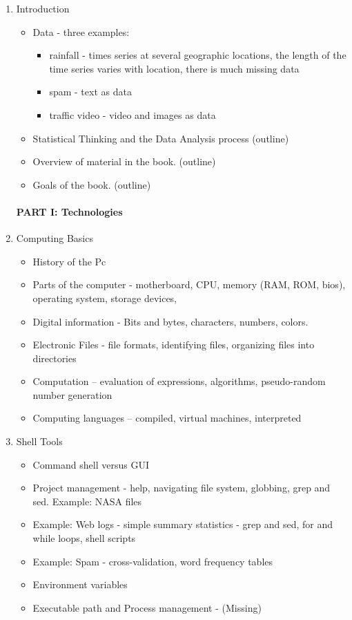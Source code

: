 \documentclass[11pt,timesroman]{article}
\begin{document}
\begin{enumerate}

\item{Introduction}
\begin{itemize}
        \item Data - three examples: 
          \begin{itemize}
            \item rainfall - times series at several geographic locations, the length of the time series varies with location, there is much missing data
            \item spam - text as data
            \item traffic video - video and images as data
           \end{itemize}
        \item Statistical Thinking and the Data Analysis process (outline)
        \item Overview of material in the book. (outline)
        \item Goals of the book. (outline)
\end{itemize}

\paragraph{PART I: Technologies}

\item{Computing Basics}
        \begin{itemize}
        \item History of the Pc
        \item Parts of the computer - motherboard, CPU, memory (RAM, ROM, bios), operating system, storage devices, 
        \item Digital information - Bits and bytes, characters, numbers, colors.
        \item Electronic Files - file formats, identifying files, organizing files into directories
        \item Computation -- evaluation of expressions, algorithms, pseudo-random number generation
        \item Computing languages -- compiled, virtual machines, interpreted
        \end{itemize}

\item{Shell Tools}
        \begin{itemize}
        \item Command shell versus GUI
        \item Project management -  help, navigating file system, globbing, grep and sed.  Example: NASA files
        \item Example: Web logs - simple summary statistics - grep and sed, for and while loops, shell scripts
        \item Example: Spam - cross-validation, word frequency tables
        \item Environment variables
        \item Executable path and Process management - (Missing) 
        \end{itemize}


\end{enumerate}
\end{document}
